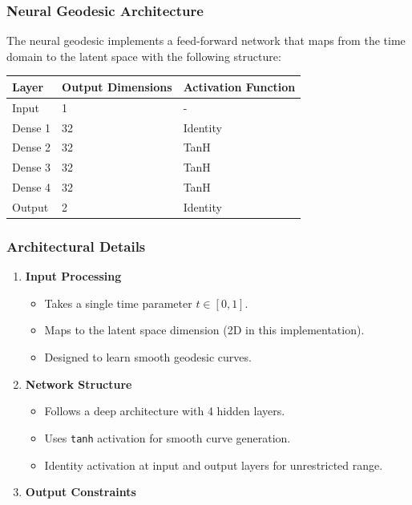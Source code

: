 \documentclass[
]{scrartcl}
\providecommand{\tightlist}{%
  \setlength{\itemsep}{0pt}\setlength{\parskip}{0pt}}\usepackage{longtable,booktabs,array}
\begin{document}
\begin{refsection}
\subsubsection{Neural Geodesic
Architecture}\label{neural-geodesic-architecture-1}

The neural geodesic implements a feed-forward network that maps from the
time domain to the latent space with the following structure:

\begin{longtable}[]{@{}lll@{}}
\toprule\noalign{}
Layer & Output Dimensions & Activation Function \\
\midrule\noalign{}
\endhead
\bottomrule\noalign{}
\endlastfoot
Input & 1 & - \\
Dense 1 & 32 & Identity \\
Dense 2 & 32 & TanH \\
Dense 3 & 32 & TanH \\
Dense 4 & 32 & TanH \\
Output & 2 & Identity \\
\end{longtable}

\subsubsection{Architectural Details}\label{architectural-details}

\begin{enumerate}
\def\labelenumi{\arabic{enumi}.}
\tightlist
\item
  \textbf{Input Processing}

  \begin{itemize}
  \tightlist
  \item
    Takes a single time parameter \(t \in [0,1]\).
  \item
    Maps to the latent space dimension (2D in this implementation).
  \item
    Designed to learn smooth geodesic curves.
  \end{itemize}
\item
  \textbf{Network Structure}

  \begin{itemize}
  \tightlist
  \item
    Follows a deep architecture with 4 hidden layers.
  \item
    Uses \texttt{tanh} activation for smooth curve generation.
  \item
    Identity activation at input and output layers for unrestricted
    range.
  \end{itemize}
\item
  \textbf{Output Constraints}


\end{enumerate}
\end{refsection}
\end{document}
